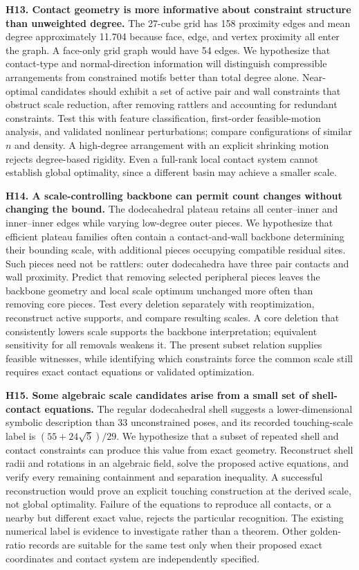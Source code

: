 \documentclass[11pt,a4paper]{article}
\begin{document}
\textbf{H13. Contact geometry is more informative about constraint structure than unweighted degree.} The 27-cube grid has 158 proximity edges and mean degree approximately 11.704 because face, edge, and vertex proximity all enter the graph. A face-only grid graph would have 54 edges. We hypothesize that contact-type and normal-direction information will distinguish compressible arrangements from constrained motifs better than total degree alone. Near-optimal candidates should exhibit a set of active pair and wall constraints that obstruct scale reduction, after removing rattlers and accounting for redundant constraints. Test this with feature classification, first-order feasible-motion analysis, and validated nonlinear perturbations; compare configurations of similar $n$ and density. A high-degree arrangement with an explicit shrinking motion rejects degree-based rigidity. Even a full-rank local contact system cannot establish global optimality, since a different basin may achieve a smaller scale.

\textbf{H14. A scale-controlling backbone can permit count changes without changing the bound.} The dodecahedral plateau retains all center--inner and inner--inner edges while varying low-degree outer pieces. We hypothesize that efficient plateau families often contain a contact-and-wall backbone determining their bounding scale, with additional pieces occupying compatible residual sites. Such pieces need not be rattlers: outer dodecahedra have three pair contacts and wall proximity. Predict that removing selected peripheral pieces leaves the backbone geometry and local scale optimum unchanged more often than removing core pieces. Test every deletion separately with reoptimization, reconstruct active supports, and compare resulting scales. A core deletion that consistently lowers scale supports the backbone interpretation; equivalent sensitivity for all removals weakens it. The present subset relation supplies feasible witnesses, while identifying which constraints force the common scale still requires exact contact equations or validated optimization.

\textbf{H15. Some algebraic scale candidates arise from a small set of shell-contact equations.} The regular dodecahedral shell suggests a lower-dimensional symbolic description than 33 unconstrained poses, and its recorded touching-scale label is $(55+24\sqrt5)/29$. We hypothesize that a subset of repeated shell and contact constraints can produce this value from exact geometry. Reconstruct shell radii and rotations in an algebraic field, solve the proposed active equations, and verify every remaining containment and separation inequality. A successful reconstruction would prove an explicit touching construction at the derived scale, not global optimality. Failure of the equations to reproduce all contacts, or a nearby but different exact value, rejects the particular recognition. The existing numerical label is evidence to investigate rather than a theorem. Other golden-ratio records are suitable for the same test only when their proposed exact coordinates and contact system are independently specified.
\end{document}
